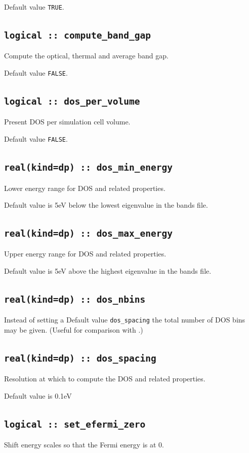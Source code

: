 \documentclass[a4paper,11pt,twoside]{book}
\begin{document}
{Default value \verb#TRUE#.

\subsection[compute\_band\_energy]{\tt logical :: compute\_band\_gap}
Compute the optical, thermal and average band gap.

Default value \verb#FALSE#.

\subsection[DOS\_per\_volume]{\tt logical :: dos\_per\_volume}
Present DOS per simulation cell volume.

Default value \verb#FALSE#.

\subsection[dos\_min\_energy]{\tt real(kind=dp) :: dos\_min\_energy}
Lower energy range for DOS and related properties.

Default value is 5eV below the lowest eigenvalue in the bands file.

\subsection[dos\_max\_energy]{\tt real(kind=dp) :: dos\_max\_energy}
Upper energy range for DOS and related properties.

Default value is 5eV above the highest eigenvalue in the bands file.


\subsection[dos\_nbins]{\tt real(kind=dp) :: dos\_nbins}
Instead of setting a Default value \verb#dos_spacing# the total number of DOS bins may be given.  (Useful for comparison with \lindos.)

\subsection[dos\_spacing]{\tt real(kind=dp) :: dos\_spacing}
Resolution at which to compute the DOS and related properties.

Default value is 0.1eV 

\subsection[set\_efermi\_zero]{\tt logical :: set\_efermi\_zero}
Shift energy scales so that the Fermi energy is at 0.

}
\end{document}
